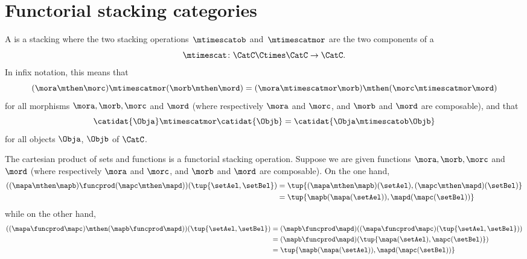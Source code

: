 
\section{Functorial stacking categories}
\label{sec:functorial-stacking}

\begin{ctdefinition}
    \label{def:functorial-stacking-cat-duplicate}
    A  is a stacking  where the two stacking operations~$\mtimescatob$ and~$\mtimescatmor$ are the two components of a  \begin{equation}
        \mtimescat\colon \CatC \Ctimes \CatC \to \CatC.
    \end{equation}
    In infix notation, this means that
    \begin{equation}
        (\mora \mthen \morc )
        \mtimescatmor (\morb \mthen \mord )
        =
        (\mora \mtimescatmor \morb )
        \mthen (\morc \mtimescatmor \mord )
    \end{equation}
    for all morphisms $\mora, \morb, \morc$ and $\mord$ (where respectively $\mora$ and $\morc$, and $\morb$ and $\mord$ are composable), and that
    \begin{equation}
        \catidat{\Obja} \mtimescatmor \catidat{\Objb} = \catidat{\Obja \mtimescatob \Objb}
    \end{equation}
    for all objects $\Obja$, $\Objb$ of $\CatC$.
\end{ctdefinition}



\begin{example}
    The cartesian product of sets and functions is a functorial stacking operation.
    Suppose we are given functions $\mora, \morb, \morc$ and $\mord$ (where respectively $\mora$ and $\morc$, and $\morb$ and $\mord$ are composable).
    On the one hand,
    \begin{align}
        ((\mapa \mthen \mapb) \funcprod (\mapc \mthen \mapd))(\tup{\setAel, \setBel}) & = \tup{(\mapa \mthen \mapb)(\setAel), (\mapc \mthen \mapd)(\setBel)} \\
                                                                                      & = \tup{\mapb(\mapa(\setAel)), \mapd(\mapc(\setBel))}
    \end{align}
    while on the other hand,
    \begin{align}
        ((\mapa \funcprod \mapc) \mthen (\mapb \funcprod \mapd))(\tup{\setAel, \setBel}) & = (\mapb \funcprod \mapd)((\mapa \funcprod \mapc)(\tup{\setAel, \setBel})) \\
                                                                                         & = (\mapb \funcprod \mapd)(\tup{\mapa(\setAel),  \mapc(\setBel)}) \\
                                                                                         & = \tup{\mapb(\mapa(\setAel)), \mapd(\mapc(\setBel))}
    \end{align}
\end{example}

